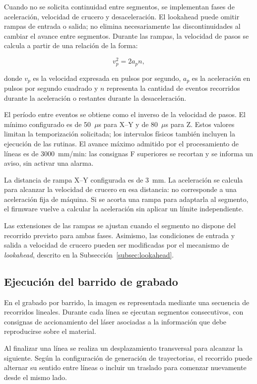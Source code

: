 \documentclass[blue,fullpaper]{ludusofficial}  %
\begin{document}
Cuando no se solicita continuidad entre segmentos, se implementan fases de aceleración, velocidad de crucero y desaceleración. El lookahead puede omitir rampas de entrada o salida; no elimina necesariamente las discontinuidades al cambiar el avance entre segmentos. Durante las rampas,
la velocidad de pasos se calcula a partir
de una relación de la forma:

\begin{equation}
    v_p^2 = 2a_p n,
\end{equation}

donde $v_p$ es la velocidad expresada en pulsos
por segundo, $a_p$ es la aceleración en pulsos
por segundo cuadrado y $n$ representa la cantidad
de eventos recorridos durante la aceleración
o restantes durante la desaceleración.

El período entre eventos se obtiene como el inverso de la velocidad de pasos. El mínimo configurado es de 50~$\mu$s para X--Y y de 80~$\mu$s para Z. Estos valores limitan la temporización solicitada; los intervalos físicos también incluyen la ejecución de las rutinas. El avance máximo admitido por el procesamiento de líneas es de 3000~mm/min: las consignas F superiores se recortan y se informa un aviso, sin activar una alarma.

La distancia de rampa X--Y configurada es de 3~mm. La aceleración se calcula para alcanzar la velocidad de crucero en esa distancia: no corresponde a una aceleración fija de máquina. Si se acorta una rampa para adaptarla al segmento, el firmware vuelve a calcular la aceleración sin aplicar un límite independiente.

Las extensiones de las rampas se ajustan cuando
el segmento no dispone del recorrido previsto
para ambas fases. Asimismo, las condiciones
de entrada y salida a velocidad de crucero
pueden ser modificadas por el mecanismo
de \textit{lookahead}, descrito en la Subsección~\ref{subsec:lookahead}.

\subsection{Ejecución del barrido de grabado}

En el grabado por barrido, la imagen es representada
mediante una secuencia de recorridos lineales.
Durante cada línea se ejecutan segmentos consecutivos,
con consignas de accionamiento del láser asociadas
a la información que debe reproducirse sobre
el material.

Al finalizar una línea se realiza un desplazamiento
transversal para alcanzar la siguiente.
Según la configuración de generación de trayectorias,
el recorrido puede alternar su sentido entre líneas
o incluir un traslado para comenzar nuevamente
desde el mismo lado.
\end{document}
